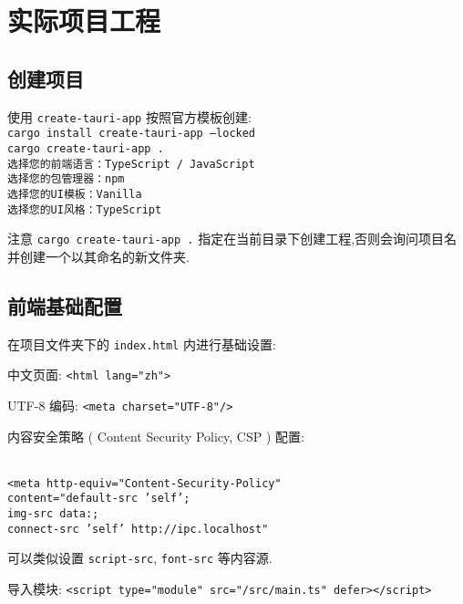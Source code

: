    \section{实际项目工程}
        \subsection{创建项目}
            使用 \texttt{create-tauri-app} 按照官方模板创建:
        \texttt{\\cargo install create-tauri-app ---locked\\cargo create-tauri-app .\\选择您的前端语言：TypeScript / JavaScript\\
选择您的包管理器：npm\\
选择您的UI模板：Vanilla\\
选择您的UI风格：TypeScript}

            注意 \texttt{cargo create-tauri-app .} 指定在当前目录下创建工程,否则会询问项目名并创建一个以其命名的新文件夹.
        \subsection{前端基础配置}
            在项目文件夹下的 \texttt{index.html} 内进行基础设置:

            中文页面: \texttt{<html lang="zh">}

            UTF-8 编码: \texttt{<meta charset="UTF-8"/>}

            内容安全策略 ( Content Security Policy, CSP ) 配置:

            \texttt{\\<meta http-equiv="Content-Security-Policy"\\
            content="default-src 'self';\\
            img-src data:;\\
            connect-src 'self' http://ipc.localhost"\\}

            可以类似设置 \texttt{script-src}, \texttt{font-src} 等内容源.

            导入模块: \texttt{<script type="module" src="/src/main.ts" defer></script>}

